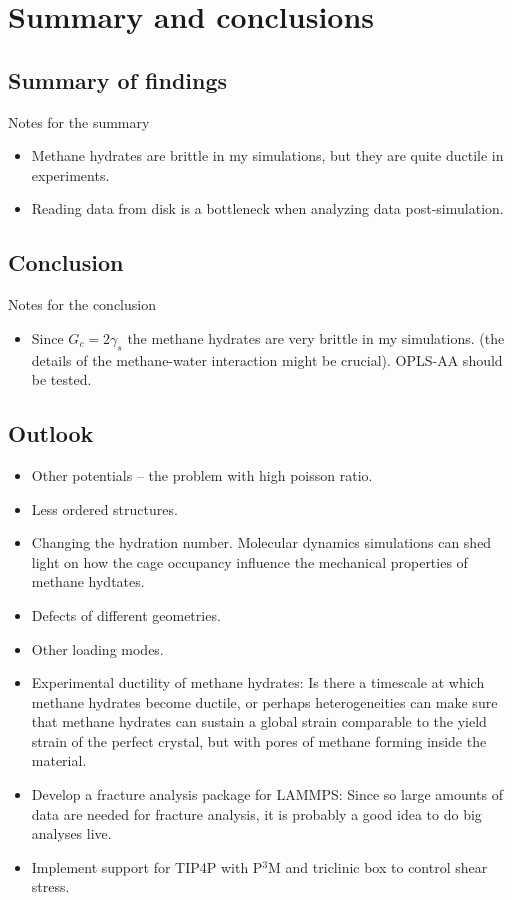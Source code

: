 \chapter{Summary and conclusions}

\section{Summary of findings}
Notes for the summary
\begin{itemize}
\item Methane hydrates are brittle in my simulations, but they are quite ductile in experiments.
\item Reading data from disk is a bottleneck when analyzing data post-simulation. 
\end{itemize}

\section{Conclusion}
Notes for the conclusion
\begin{itemize}
\item Since $G_c = 2\gamma_s$ the methane hydrates are very brittle in my simulations. (the details of the methane-water interaction might be crucial). OPLS-AA should be tested.
\end{itemize}


\section{Outlook}
\begin{itemize}
\item Other potentials – the problem with high poisson ratio.
\item Less ordered structures.
\item Changing the hydration number. Molecular dynamics simulations can shed light on how the cage occupancy influence the mechanical properties of methane hydtates.
\item Defects of different geometries.
\item Other loading modes.
\item Experimental ductility of methane hydrates: Is there a timescale at which methane hydrates become ductile, or perhaps heterogeneities can make sure that methane hydrates can sustain a global strain comparable to the yield strain of the perfect crystal, but with pores of methane forming inside the material. 
\item Develop a fracture analysis package for LAMMPS: Since so large amounts of data are needed for fracture analysis, it is probably a good idea to do big analyses live.
\item Implement support for TIP4P with P$^3$M and triclinic box to control shear stress.
\end{itemize}